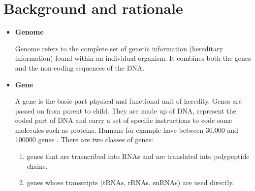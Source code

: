 \documentclass[10pt,twocolumn,letterpaper]{article}
\begin{document}
\section{Background and rationale}
 {
   \begin{itemize}
      \item \textbf{Genome}
      \par Genome refers to the complete set of genetic information (hereditary information) found within an individual organism.
       \cite{krawetz2003introduction} It combines   both the genes and the non-coding sequences of the DNA.

      \item \textbf{Gene} 
      \par A gene is the basic part physical and functional unit of heredity. Genes are passed on from parent to child. They     are made up of DNA, represent the coded part of DNA and carry a set of specific instructions to code some molecules such as proteins. Humans for example have between 30.000 and 100000 genes \cite{krawetz2003introduction}. There are two classes of genes:
      \begin{enumerate}
          \item genes that are trasncribed into RNAs and are translated into polypeptide chains.
          \item genes whose transcripts (tRNAs, rRNAs, snRNAs) are used directly.
      \end{enumerate}


\end{itemize}}
\end{document}
